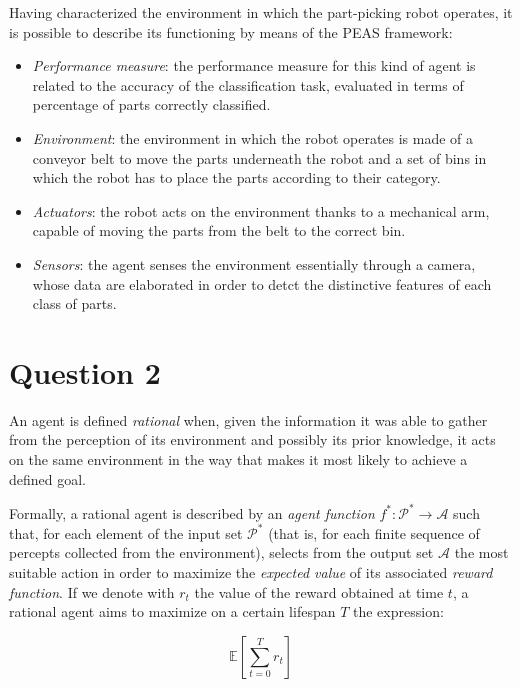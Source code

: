 \documentclass[letterpaper,headings=standardclasses]{scrartcl}
\begin{document}
Having characterized the environment in which the part-picking robot operates, it is possible to describe its functioning by means of the PEAS framework:

\begin{itemize}

\item \emph{Performance measure}: the performance measure for this kind of agent is related to the accuracy of the classification task, evaluated in terms of percentage of parts correctly classified.

\item \emph{Environment}: the environment in which the robot operates is made of a conveyor belt to move the parts underneath the robot and a set of bins in which the robot has to place the parts according to their category.

\item \emph{Actuators}: the robot acts on the environment thanks to a mechanical arm, capable of moving the parts from the belt to the correct bin.

\item \emph{Sensors}: the agent senses the environment essentially through a camera, whose data are elaborated in order to detct the distinctive features of each class of parts.

\end{itemize}

\section{Question 2}

An agent is defined \emph{rational} when, given the information it was able to gather from the perception of its environment and possibly its prior knowledge, it acts on the same environment in the way that makes it most likely to achieve a defined goal.

Formally, a rational agent is described by an \emph{agent function} $ f^* : \mathcal{P}^* \rightarrow \mathcal{A} $ such that, for each element of the input set $ \mathcal{P}^* $ (that is, for each finite sequence of percepts collected from the environment), selects from the output set $ \mathcal{A} $ the most suitable action in order to maximize the \emph{expected value} of its associated \emph{reward function}. If we denote with $r_t$ the value of the reward obtained at time $t$, a rational agent aims to maximize on a certain lifespan $T$ the expression:

$$ \mathbb{E} \left[ \sum_{t=0}^{T} r_t \right] $$
\end{document}
